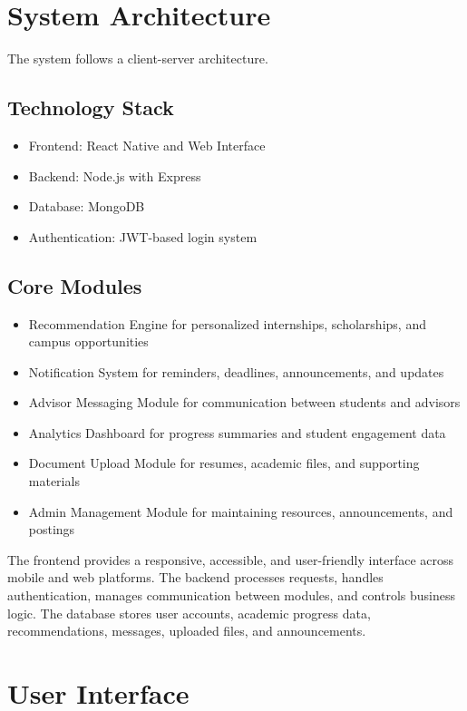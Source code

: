 \documentclass[12pt]{article}
\begin{document}
\section{System Architecture}

The system follows a client-server architecture.

\subsection{Technology Stack}

\begin{itemize}
\item Frontend: React Native and Web Interface
\item Backend: Node.js with Express
\item Database: MongoDB
\item Authentication: JWT-based login system
\end{itemize}

\subsection{Core Modules}

\begin{itemize}
\item Recommendation Engine for personalized internships, scholarships, and campus opportunities
\item Notification System for reminders, deadlines, announcements, and updates
\item Advisor Messaging Module for communication between students and advisors
\item Analytics Dashboard for progress summaries and student engagement data
\item Document Upload Module for resumes, academic files, and supporting materials
\item Admin Management Module for maintaining resources, announcements, and postings
\end{itemize}

The frontend provides a responsive, accessible, and user-friendly interface across mobile and web platforms.
The backend processes requests, handles authentication, manages communication between modules, and controls business logic.
The database stores user accounts, academic progress data, recommendations, messages, uploaded files, and announcements.

\section{User Interface}
\end{document}
